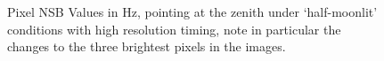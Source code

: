 \begin{figure}[t!]
\begin{minipage}{\linewidth}

\caption{Pixel NSB Values in Hz, pointing at the zenith under `half-moonlit' conditions with high resolution timing, note in particular the changes to the three brightest pixels in the images.}

\end{minipage}
\label{fig:zenithpixel}
\end{figure} 

